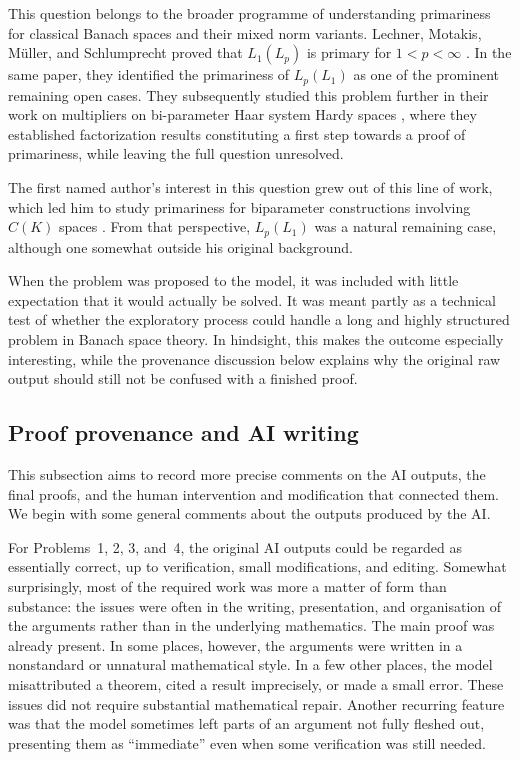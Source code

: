 \documentclass[11pt,reqno]{amsart}
\theoremstyle{plain}
\theoremstyle{definition}
\begin{document}
This question belongs to the broader programme of understanding primariness for classical Banach spaces and their mixed norm variants. Lechner, Motakis, M\"uller, and Schlumprecht proved that $L_1(L_p)$ is primary for $1<p<\infty$ \cite{LechnerMotakisMullerSchlumprecht2022L1Lp}. In the same paper, they identified the primariness of $L_p(L_1)$ as one of the prominent remaining open cases. They subsequently studied this problem further in their work on multipliers on bi-parameter Haar system Hardy spaces \cite{LechnerMotakisMullerSchlumprecht2024}, where they established factorization results constituting a first step towards a proof of primariness, while leaving the full question unresolved.

The first named author's interest in this question grew out of this line of work, which led him to study primariness for biparameter constructions involving $C(K)$ spaces \cite{Acuaviva2026}. From that perspective, $L_p(L_1)$ was a natural remaining case, although one somewhat outside his original background.

When the problem was proposed to the model, it was included with little expectation that it would actually be solved. It was meant partly as a technical test of whether the exploratory process could handle a long and highly structured problem in Banach space theory. In hindsight, this makes the outcome especially interesting, while the provenance discussion below explains why the original raw output should still not be confused with a finished proof.

\medskip


\subsection{Proof provenance and AI writing}
\label{susec:proofs-and-provenance}

This subsection aims to record more precise comments on the AI outputs, the final proofs, and the human intervention and modification that connected them. We begin with some general comments about the outputs produced by the AI.

For Problems~1, 2, 3, and~4, the original AI outputs could be regarded as essentially correct, up to verification, small modifications, and editing. Somewhat surprisingly, most of the required work was more a matter of form than substance: the issues were often in the writing, presentation, and organisation of the arguments rather than in the underlying mathematics. The main proof was already present. In some places, however, the arguments were written in a nonstandard or unnatural mathematical style. In a few other places, the model misattributed a theorem, cited a result imprecisely, or made a small error. These issues did not require substantial mathematical repair. Another recurring feature was that the model sometimes left parts of an argument not fully fleshed out, presenting them as ``immediate'' even when some verification was still needed.
\end{document}

